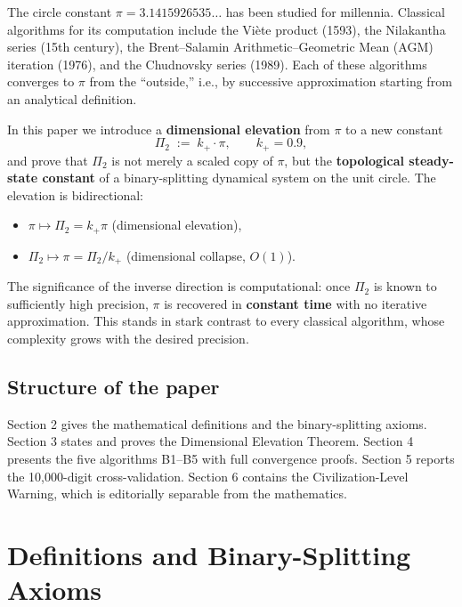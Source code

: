 \documentclass[12pt,a4paper]{article}
\begin{document}
The circle constant $\pi = 3.1415926535\dots$ has been studied for millennia. Classical algorithms for its computation include the Vi\`ete product (1593), the Nilakantha series (15th century), the Brent--Salamin Arithmetic--Geometric Mean (AGM) iteration (1976), and the Chudnovsky series (1989). Each of these algorithms converges to $\pi$ from the ``outside,'' i.e., by successive approximation starting from an analytical definition.

In this paper we introduce a \textbf{dimensional elevation} from $\pi$ to a new constant
\begin{equation}\label{eq:pi2_def}
\Pi_2 \;:=\; k_+ \cdot \pi, \qquad k_+ = 0.9,
\end{equation}
and prove that $\Pi_2$ is not merely a scaled copy of $\pi$, but the \textbf{topological steady-state constant} of a binary-splitting dynamical system on the unit circle. The elevation is bidirectional:
\begin{itemize}
  \item[\textbf{Forward}] $\pi \mapsto \Pi_2 = k_+\pi$ (dimensional elevation),
  \item[\textbf{Inverse}] $\Pi_2 \mapsto \pi = \Pi_2 / k_+$ (dimensional collapse, $O(1)$).
\end{itemize}

The significance of the inverse direction is computational: once $\Pi_2$ is known to sufficiently high precision, $\pi$ is recovered in \textbf{constant time} with no iterative approximation. This stands in stark contrast to every classical algorithm, whose complexity grows with the desired precision.

\subsection{Structure of the paper}

Section 2 gives the mathematical definitions and the binary-splitting axioms. Section 3 states and proves the Dimensional Elevation Theorem. Section 4 presents the five algorithms B1--B5 with full convergence proofs. Section 5 reports the 10,000-digit cross-validation. Section 6 contains the Civilization-Level Warning, which is editorially separable from the mathematics.

\section{Definitions and Binary-Splitting Axioms}
\end{document}
